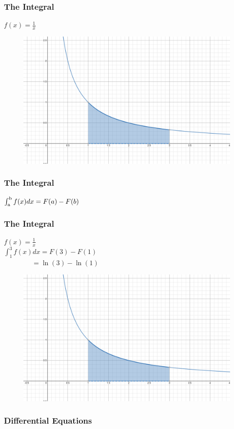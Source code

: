 \documentclass{beamer}
\begin{document}
    \begin{frame}
        \frametitle{The Integral}
        \(f(x)=\frac{1}{x}\)\\[26pt]
        \begin{figure}
            \centering
            \includegraphics[width=0.6\linewidth]{include/images/invx_4.png}
        \end{figure}
    \end{frame}

    \begin{frame}
        \frametitle{The Integral}
        \(\int_{\mathrm{a}}^{\mathrm{b}} f(x) dx = F(a) - F(b)\)\\
    \end{frame}

    \begin{frame}
        \frametitle{The Integral}
        \(f(x)=\frac{1}{x}\)\\
        \(\int_1^3 f(x) dx = F(3) - F(1)\)\\
        \(\hspace{49pt}=\ln(3)-\ln(1)\)
        \begin{figure}
            \centering
            \includegraphics[width=0.6\linewidth]{include/images/invx_4.png}
        \end{figure}
    \end{frame}

    \begin{frame}
        \frametitle{Differential Equations}
        
        
    
    \end{frame}
\end{document}
